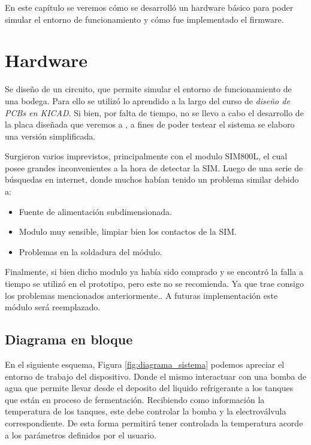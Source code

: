 En este capítulo se veremos cómo se desarrolló un hardware básico para poder simular el entorno de funcionamiento y cómo fue implementado el firmware.

\section{Hardware}

Se diseño de un circuito, que permite simular el entorno de funcionamiento de una bodega. Para ello se utilizó lo aprendido a la largo del curso de \emph{diseño de PCBs en KICAD}. Si bien, por falta de tiempo, no se llevo a cabo el desarrollo de la placa diseñada que veremos a , a fines de poder testear el sistema se elaboro una versión simplificada. 

Surgieron varios imprevistos, principalmente con el modulo SIM800L, el cual posee grandes inconvenientes a la hora de detectar la SIM. Luego de una serie de búsquedas en internet, donde muchos habían tenido un problema similar debido a:
\begin{itemize}
  \item Fuente de alimentación subdimensionada.
  \item Modulo muy sensible, limpiar bien los contactos de la SIM.
  \item Problemas en la soldadura del módulo.
\end{itemize}
Finalmente, si bien dicho modulo ya había sido comprado y se encontró la falla a tiempo se utilizó en el prototipo, pero este no se recomienda. Ya que trae consigo los problemas mencionados anteriormente.. A futuras implementación este módulo será reemplazado.


\subsection{Diagrama en bloque}
En el siguiente esquema, Figura \ref{fig:diagrama_sistema} podemos apreciar el entorno de trabajo del dispositivo. Donde el mismo   interactuar con una bomba de agua que permite llevar desde el deposito del liquido refrigerante a los tanques que están en proceso de fermentación.
Recibiendo como información la temperatura de los tanques, este debe controlar la bomba y la electroválvula correspondiente. De esta forma permitirá tener controlada la temperatura acorde a los parámetros definidos por el usuario. 


